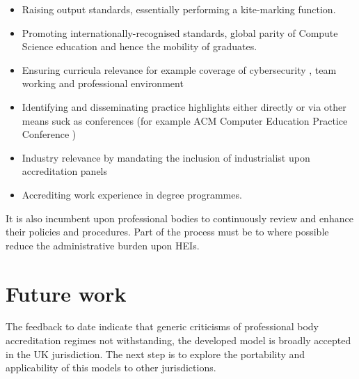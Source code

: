 \documentclass[sigconf]{acmart}
\begin{document}
\begin{itemize}

    
    \item {Raising output standards, essentially performing a kite-marking function.}

\item {Promoting internationally-recognised standards, global parity of Compute Science education and hence the mobility of graduates.} 

\item {Ensuring curricula relevance for example coverage of cybersecurity \cite{Cricketal2019}, team working and professional environment}

\item {Identifying and disseminating practice highlights either directly \cite{practice_highlights_2020} or via other means suck as conferences (for example ACM Computer Education Practice Conference \cite{CrickEtAl2020Cep}} )

\item {Industry relevance by mandating the inclusion of industrialist upon accreditation panels} 

\item {Accrediting work experience in degree programmes.}
\end{itemize}

It is also incumbent upon professional bodies to continuously review and enhance their policies and procedures. Part of the process must be to where possible reduce the administrative burden upon HEIs.

\section{Future work}
The feedback to date indicate that generic criticisms of professional body accreditation regimes not withstanding, the developed model is broadly accepted in the UK jurisdiction. The next step is to explore the portability and applicability of this models to other jurisdictions.  

\begin{comment}


\subsection{Acknowledgements}
Many have contributed to this work: BCS Assessors; visited BCS Education Affiliate HEI's; respondants to surveys; BCS AAC and BCS Accreditation Team.

\end{comment}



\appendix
\end{document}
